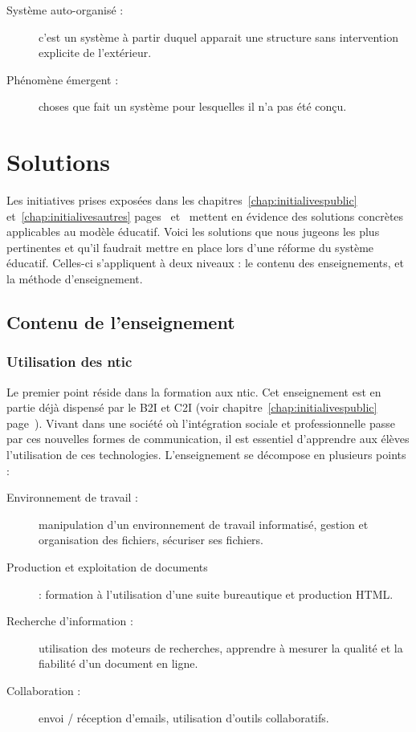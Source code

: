 \begin{description}
  \item[Système auto-organisé :] c'est un système à partir duquel apparait une structure sans intervention explicite de l'extérieur.
  \item[Phénomène émergent :] choses que fait un système pour lesquelles il n'a pas été conçu.
\end{description}

\chapter{Solutions}
\label{chap:solutions}

Les initiatives prises exposées dans les chapitres~\ref{chap:initialivespublic} et~\ref{chap:initialivesautres} pages~\pageref{chap:initialivespublic} et~\pageref{chap:initialivesautres} mettent en évidence des solutions concrètes applicables au modèle éducatif. Voici les solutions que nous jugeons les plus pertinentes et qu'il faudrait mettre en place lors d'une réforme du système éducatif. Celles-ci s'appliquent à deux niveaux : le contenu des enseignements, et la méthode d'enseignement.

\section{Contenu de l'enseignement}
\subsection{Utilisation des \gls{ntic}}
Le premier point réside dans la formation aux \gls{ntic}. Cet enseignement est en partie déjà dispensé par le B2I et C2I (voir chapitre~\ref{chap:initialivespublic} page~\pageref{chap:initialivespublic}). Vivant dans une société où l'intégration sociale et professionnelle passe par ces nouvelles formes de communication, il est essentiel d'apprendre aux élèves l'utilisation de ces technologies. L'enseignement se décompose en plusieurs points :

\begin{description}
  \item[Environnement de travail :] manipulation d'un environnement de travail informatisé, gestion et organisation des fichiers, sécuriser ses fichiers.
  \item[Production et exploitation de documents] : formation à l'utilisation d'une suite bureautique et production HTML.
  \item[Recherche d'information :] utilisation des moteurs de recherches, apprendre à mesurer la qualité et la fiabilité d'un document en ligne.
  \item[Collaboration :] envoi / réception d'emails, utilisation d'outils collaboratifs.
\end{description}

